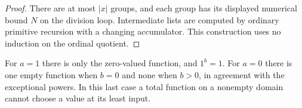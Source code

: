 \begin{proof}
There are at most $|x|$ groups, and each group has its displayed
numerical bound $N$ on the division loop. Intermediate lists are
computed by ordinary primitive recursion with a changing accumulator.
This construction uses no induction on the ordinal quotient.
\end{proof}
For $a=1$ there is only the zero-valued function, and $1^b=1$.
For $a=0$ there is one empty function when $b=0$ and none when $b>0$,
in agreement with the exceptional powers. In this last case a total
function on a nonempty domain cannot choose a value at its least input.
